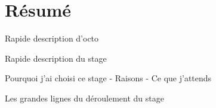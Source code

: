 \chapter{Résumé}

Rapide description d'octo

Rapide description du stage

Pourquoi j'ai choisi ce stage
    - Raisons
    - Ce que j'attends

Les grandes lignes du déroulement du stage


